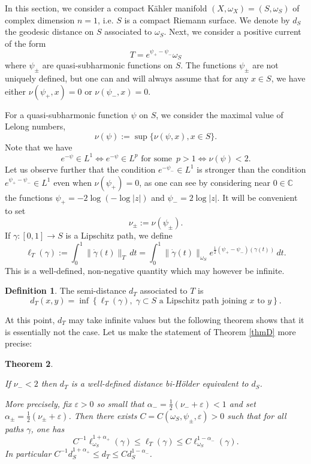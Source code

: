 \documentclass[a4paper,11pt,leqno,english]{smfart}
\theoremstyle{plain}
\newtheorem{thm}{Theorem}[section]
\theoremstyle{plain}
\numberwithin{equation}{section} %
\numberwithin{figure}{section} %
\theoremstyle{plain}
\theoremstyle{plain}
\theoremstyle{remark}
\theoremstyle{remark}
\theoremstyle{definition}
\theoremstyle{plain}
\theoremstyle{plain}
\theoremstyle{definition}
\newtheorem{defi}[thm]{Definition}
\newcommand{\e}{\varepsilon}
\newcommand{\om}{\omega}
\newcommand{\p}{\psi}
\begin{document}
 In this section, we consider a compact Kähler manifold $(X, \omega_X)=(S,\omega_S)$ of complex dimension $n=1$, i.e. $S$ is a compact Riemann surface. We denote by $d_S$ the geodesic distance on $S$ associated to $\om_S$. Next, we consider a positive current of the form 
 \begin{equation}
 \label{T dim 1}
 T=e^{\psi_+-\psi_-}\omega_S
 \end{equation}
 where $\psi_\pm$ are quasi-subharmonic functions on $S$. The functions $\psi_\pm$ are not uniquely defined, but one can and will always assume that for any $x\in S$, we have either $\nu(\psi_+,x)=0$ or $\nu(\psi_-,x)=0$. 
 
 For a quasi-subharmonic function $\psi$ on $S$, we consider the maximal value of Lelong numbers,
$$
\nu(\p):=\sup \{ \nu(\p,x), x \in S \}.
$$
Note that we have
\[ e^{-\p}\in L^1 \Longleftrightarrow e^{-\p} \in L^p  \,\, \mbox{for} \, \, \mbox{some } \, p>1\Longleftrightarrow \nu(\p)<2.\]
Let us observe further that the condition $e^{-\psi_-}\in L^1$ is stronger than the condition $e^{\psi_+-\psi_-}\in L^1$ even when $\nu(\p_+)=0$, as one can see by considering near $0\in \mathbb C$ the functions $\psi_+=-2\log(- \log |z|)$ and $\psi_-=2\log |z|$. It will be convenient to set
\[\nu_\pm:=\nu(\psi_\pm).\] 
  If $\gamma:[0,1]\to S$ is a Lipschitz path, we define
\[ \ell_{T}(\gamma):=\int_0^1   \|\dot{\gamma}(t)\|_{T} \,dt= \int_{0}^1 \|\dot \gamma(t)\|_{\omega_S} e^{\frac 12(\psi_+-\psi_-)(\gamma(t))}\,dt.\]
This is a well-defined, non-negative quantity which may however be infinite. 

\begin{defi} 
\label{def:distance1}
The semi-distance $d_{T}$ associated to $T$ is
$$
d_{T}(x,y)=\inf \left\{ \ell_{T}(\gamma), \; 
\gamma\subset S \text{ a Lipschitz path joining } x \text{ to } y \right\}.
$$
\end{defi} 

At this point, $d_T$ may take infinite values but the following theorem shows that it is essentially not the case.
Let us make the statement of Theorem \ref{thmD} more precise:

\begin{thm}
\label{dist dim 1}

If $\nu_-<2$ then $d_T$ is a well-defined distance  bi-Hölder equivalent to $d_S$.

\noindent
More precisely, fix $\e>0$ so small that $\alpha_{-}=\frac{1}{2}(\nu_-+\e)<1$ and set $ \alpha_{\pm}=\frac {1}{2}(\nu_{\pm}+\e)$.
Then there exists $C=C(\om_S, \p_{\pm}, \e)>0$ such that  for all paths $\gamma$, one has 
$$  
C^{-1} \ell_{\omega_S}^{1+\alpha_+}(\gamma) \leq \ell_{T}(\gamma) \leq C \ell_{\omega_S}^{1-\alpha_-}(\gamma).
$$
  In particular $C^{-1} d_{S}^{1+\alpha_+} \leq d_{T} \leq C d_{S}^{1-\alpha_-}$.
  \end{thm}
  
\end{document}
